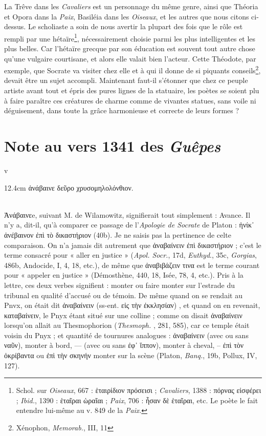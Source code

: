 \documentclass{book}%
\newcommand{\italique}[1]{\textit{#1}}%
\newcommand{\espace}[1]{\hspace{#1}}%
\newcommand{\fantome}{{\color{white}v}}
\newcommand{\Note}[1]{\section*{#1}%
\addcontentsline{toc}{section}{#1}}
\newcommand{\note}[1]{\footnote{#1}}
\newcommand{\citComm}[1]{\fantome\\
\espace{1cm}\begin{minipagewithmarginpars}{12.4cm}%
#1
\end{minipagewithmarginpars}%
}
\begin{document}
La Trêve dans les \italique{Cavaliers} est un personnage du même genre, ainsi que Théoria et Opora dans la \italique{Paix}, Basiléia dans les \italique{Oiseaux}, et les autres que nous citons ci-dessus. 
Le scholiaste a soin de nous avertir la plupart des fois que le rôle est rempli par une hétaïre\note{Schol. sur \italique{Oiseaux}, 667 : ἑταιρίδιον πρόσεισι ; \italique{Cavaliers}, 1388 : πόρνας εἰσφέρει ; \italique{Ibid.}, 1390 : ἑταῖραι ὡραῖαι ; \italique{Paix}, 706 : ἦσαν δὲ ἑταῖραι, etc. Le poète le fait entendre lui-même au v. 849 de la \italique{Paix}.}, nécessairement choisie parmi les plus intelligentes et les plus belles. Car l'hétaïre grecque par son éducation est souvent tout autre chose qu'une vulgaire courtisane, et alors elle valait bien l'acteur. Cette Théodote, par exemple, que Socrate va visiter chez elle et à qui il donne de si piquants conseils\note{Xénophon, \italique{Memorab.}, III, 11}, devait être un sujet accompli. Maintenant faut-il s'étonner que chez ce peuple artiste avant tout et épris des pures lignes de la statuaire, les poètes se soient plu à faire paraître ces créatures de charme comme de vivantes statues, sans voile ni déguisement, dans toute la grâce harmonieuse et correcte de leurs formes ?


\Note{Note au vers 1341 des \italique{Guêpes}}

\citComm{ἀνάβαινε δεῦρο χρυσομηλολόνθιον.}\\


Ἀνάβαινεe, suivant M. de Wilamowitz, signifierait tout simplement : Avance. Il n'y a, dit-il, qu'à comparer ce passage de l'\italique{Apologie de Socrate} de Platon : ἡνίκ᾽ ἀνέβαινον ἐπὶ τὸ δικαστήριον (40b). 
Je ne saisis pas la pertinence de celte comparaison. On n'a jamais dit autrement que ἀναβαίνειν ἐπὶ δικαστήριον ; c'est le terme consacré pour « aller en justice » (\italique{Apol. Socr.}, 17d, \italique{Euthyd}., 35c, \italique{Gorgias}, 486b, Andocide, I, 4, 18, etc.), de même que ἀναβιβάζειν τινα est le terme courant pour « appeler en justice » (Démosthène, 440, 18, Isée, 78, 4, etc.). Pris à la lettre, ces deux verbes signifient : monter ou faire monter sur l'estrade du tribunal en qualité d'accusé ou de témoin. De même quand on se rendait au Pnvx, on était dit ἀναβαίνειν (ss-ent. εἰς τὴν ἐκκλησίαν) , et quand on en revenait, καταβαίνειν, le Pnyx étant situé sur une colline ; comme on disait ἀναβαίνειν lorsqu'on allait au Thesmophorion (\italique{Thesmoph.} , 281, 585), car ce temple était voisin du Pnyx ; et quantité de tournures analogues : ἀναβαίνειν (avec ou sans ναῦν), monter à bord, — (avec ou sans ἐφ᾿ ἵππον), monter à cheval, -- ἐπὶ τὸν ὀκρίβαντα ou ἐπὶ τὴν σκηνήν monter sur la scène (Platon, \italique{Banq.}, 19b, Pollux, IV, 127). 
\end{document}
